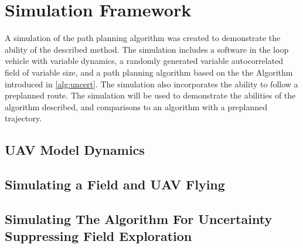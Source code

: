 \chapter{Simulation Framework}
A simulation of the path planning algorithm was created to demonstrate the ability of the described method. The simulation includes a software in the loop vehicle with variable dynamics, a randomly generated variable autocorrelated field of variable size, and a path planning algorithm based on the the Algorithm introduced in \ref{alg:uncert}. The simulation also incorporates the ability to follow a preplanned route. The simulation will be used to demonstrate the abilities of the algorithm described, and comparisons to an algorithm with a preplanned trajectory. 

\section{UAV Model Dynamics}
\section{Simulating a Field and UAV Flying}
\section{Simulating The Algorithm For Uncertainty Suppressing Field Exploration}